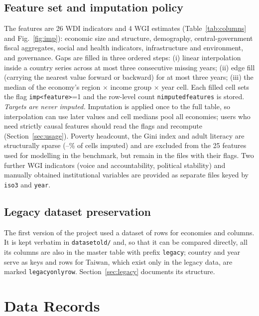 \documentclass[11pt,a4paper]{article}
\DeclareRobustCommand*{\_}{\textunderscore\hskip0pt\relax}
\begin{document}
\subsection{Feature set and imputation policy}
The \DNumFeat{} features are 26 WDI indicators and 4 WGI estimates (Table~\ref{tab:columns} and Fig.~\ref{fig:imp}): economic size and structure, demography, central-government fiscal aggregates, social and health indicators, infrastructure and environment, and governance. Gaps are filled in three ordered steps: (i) linear interpolation inside a country series across at most three consecutive missing years; (ii) edge fill (carrying the nearest value forward or backward) for at most three years; (iii) the median of the economy's region $\times$ income group $\times$ year cell. Each filled cell sets the flag \texttt{imp\_<feature>}=1 and the row-level count \texttt{n\_imputed\_features} is stored. \emph{Targets are never imputed.} Imputation is applied once to the full table, so interpolation can use later values and cell medians pool all economies; users who need strictly causal features should read the flags and recompute (Section~\ref{sec:usage}). Poverty headcount, the Gini index and adult literacy are structurally sparse (\DImpPov--\DImpLit\% of cells imputed) and are excluded from the 25 features used for modelling in the benchmark, but remain in the files with their flags. Two further WGI indicators (voice and accountability, political stability) and manually obtained institutional variables are provided as separate files keyed by \texttt{iso3} and \texttt{year}.

\subsection{Legacy dataset preservation}
The first version of the project used a dataset of \DLegacyRows{} rows for \DLegacyEcon{} economies and \DLegacyCols{} columns. It is kept verbatim in \texttt{dataset\_old/} and, so that it can be compared directly, all its columns are also in the master table with prefix \texttt{legacy\_}; country and year serve as keys and \DLegacyOnlyRows{} rows for Taiwan, which exist only in the legacy data, are marked \texttt{legacy\_only\_row}. Section~\ref{sec:legacy} documents its structure.

\section{Data Records}\label{sec:records}
\end{document}
